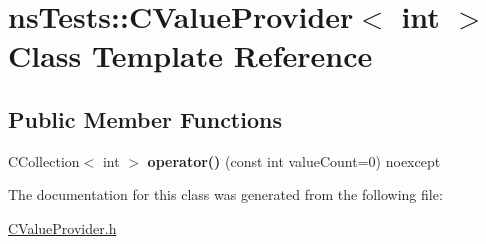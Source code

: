\hypertarget{classnsTests_1_1CValueProvider_3_01int_01_4}{\section{ns\+Tests\+:\+:C\+Value\+Provider$<$ int $>$ Class Template Reference}
\label{classnsTests_1_1CValueProvider_3_01int_01_4}
}
\subsection*{Public Member Functions}
\begin{DoxyCompactItemize}
\item 
\hypertarget{classnsTests_1_1CValueProvider_3_01int_01_4_aa73e06544d45928cf1fda161bc891ec0}{C\+Collection$<$ int $>$ {\bfseries operator()} (const int value\+Count=0) noexcept}\label{classnsTests_1_1CValueProvider_3_01int_01_4_aa73e06544d45928cf1fda161bc891ec0}

\end{DoxyCompactItemize}


The documentation for this class was generated from the following file\+:\begin{DoxyCompactItemize}
\item 
\hyperlink{CValueProvider_8h}{C\+Value\+Provider.\+h}\end{DoxyCompactItemize}
